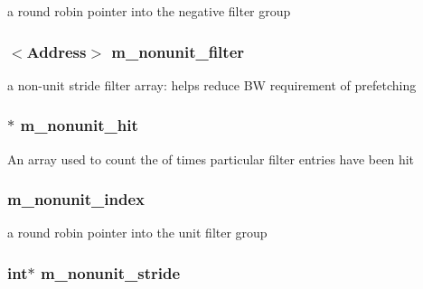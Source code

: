 a round robin pointer into the negative filter group \hypertarget{classPrefetcher_a561535cdda35027c698a573b6b3e5e52}{
\subsubsection[{m\_\-nonunit\_\-filter}]{$<${\bf Address}$>$ {\bf m\_\-nonunit\_\-filter}}}
\label{classPrefetcher_a561535cdda35027c698a573b6b3e5e52}
a non-\/unit stride filter array: helps reduce BW requirement of prefetching \hypertarget{classPrefetcher_ad152c2b22b30ca16bd8a4247fbf54e41}{
\subsubsection[{m\_\-nonunit\_\-hit}]{$\ast$ {\bf m\_\-nonunit\_\-hit}}}
\label{classPrefetcher_ad152c2b22b30ca16bd8a4247fbf54e41}
An array used to count the of times particular filter entries have been hit \hypertarget{classPrefetcher_abf85cabfde70657a26802059aeb4b971}{
\subsubsection[{m\_\-nonunit\_\-index}]{ {\bf m\_\-nonunit\_\-index}}}
\label{classPrefetcher_abf85cabfde70657a26802059aeb4b971}


a round robin pointer into the unit filter group \hypertarget{classPrefetcher_ae5f5874d1f5f2ae17e490bc3e932e2bc}{
\subsubsection[{m\_\-nonunit\_\-stride}]{\setlength{\rightskip}{0pt plus 5cm}int$\ast$ {\bf m\_\-nonunit\_\-stride}}}
\label{classPrefetcher_ae5f5874d1f5f2ae17e490bc3e932e2bc}



